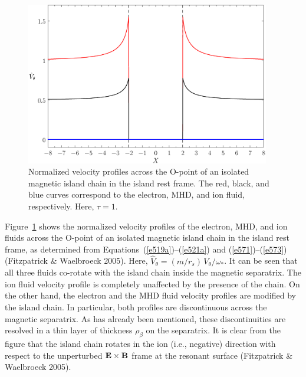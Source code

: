 \documentclass[notitlepage,12pt]{article}
\begin{document}
\begin{figure}[t]
\centerline{\includegraphics[width=0.95\textwidth]{velocity.pdf}}
\caption{Normalized velocity profiles across the O-point of an isolated magnetic island chain in the island rest frame. The red, black, and
blue curves correspond to the electron, MHD, and ion fluid, respectively. Here, $\tau=1$. }\label{f8}
\end{figure}

Figure~\ref{f8} shows the normalized velocity profiles of the electron, MHD, and ion fluids across the O-point of an isolated magnetic island
chain in the island rest frame, as determined from Equations~(\ref{e519a})--(\ref{e521a}) and
(\ref{e571})--(\ref{e573}) (Fitzpatrick \& Waelbroeck 2005). Here, $\hat{V}_\theta =(m/r_s)\,V_\theta/\omega_\ast$. It can be seen that all three fluids co-rotate with the island
chain inside the magnetic separatrix. The ion fluid velocity profile is completely unaffected by the presence of the  chain. 
On the other hand, the electron and the MHD fluid velocity profiles are modified by the island chain. In particular, both profiles
are discontinuous across the magnetic separatrix.  As has already been mentioned, these discontinuities are resolved in a thin layer of
thickness $\rho_\beta$ on the separatrix. It is clear from the figure that the island chain rotates in the ion (i.e., negative) direction with respect to
the unperturbed ${\bf E}\times {\bf B}$ frame at the resonant surface (Fitzpatrick \& Waelbroeck 2005). 
\end{document}
